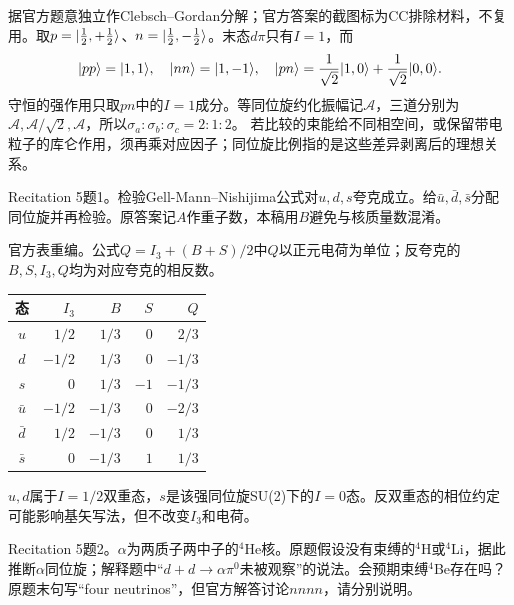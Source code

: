 \begin{solution}
据官方题意独立作Clebsch--Gordan分解；官方答案的截图标为CC排除材料，不复用。取$p=\lvert \frac12,+\frac12\rangle$、$n=\lvert \frac12,-\frac12\rangle$。末态$d\pi$只有$I=1$，而
\begin{equation}
 \lvert pp\rangle=\lvert 1,1\rangle,\quad \lvert nn\rangle=\lvert 1,-1\rangle,\quad
 \lvert pn\rangle=\frac1{\sqrt2}\lvert 1,0\rangle+\frac1{\sqrt2}\lvert 0,0\rangle.
\end{equation}
守恒的强作用只取$pn$中的$I=1$成分。等同位旋约化振幅记$\mathcal A$，三道分别为$\mathcal A,\mathcal A/\sqrt2,\mathcal A$，所以$\sigma_a:\sigma_b:\sigma_c=2:1:2$。
若比较的束能给不同相空间，或保留带电粒子的库仑作用，须再乘对应因子；同位旋比例指的是这些差异剥离后的理想关系。
\end{solution}
\begin{exercise}\label{ex:rec-5-1}
Recitation 5题1。检验Gell-Mann--Nishijima公式对$u,d,s$夸克成立。给$\bar u,\bar d,\bar s$分配同位旋并再检验。原答案记$A$作重子数，本稿用$B$避免与核质量数混淆。
\end{exercise}
\begin{solution}
官方表重编。公式$Q=I_3+(B+S)/2$中$Q$以正元电荷为单位；反夸克的$B,S,I_3,Q$均为对应夸克的相反数。
\begin{center}\begin{tabular}{c|rrrr}\toprule
态&$I_3$&$B$&$S$&$Q$\\\midrule
$u$&$1/2$&$1/3$&$0$&$2/3$\\
$d$&$-1/2$&$1/3$&$0$&$-1/3$\\
$s$&$0$&$1/3$&$-1$&$-1/3$\\
$\bar u$&$-1/2$&$-1/3$&$0$&$-2/3$\\
$\bar d$&$1/2$&$-1/3$&$0$&$1/3$\\
$\bar s$&$0$&$-1/3$&$1$&$1/3$\\\bottomrule
\end{tabular}\end{center}
$u,d$属于$I=1/2$双重态，$s$是该强同位旋SU(2)下的$I=0$态。反双重态的相位约定可能影响基矢写法，但不改变$I_3$和电荷。
\end{solution}
\begin{exercise}\label{ex:rec-5-2}
Recitation 5题2。$\alpha$为两质子两中子的$^4$He核。原题假设没有束缚的$^4$H或$^4$Li，据此推断$\alpha$同位旋；解释题中“$d+d\to\alpha\pi^0$未被观察”的说法。会预期束缚$^4$Be存在吗？原题末句写“four neutrinos”，但官方解答讨论$nnnn$，请分别说明。
\end{exercise}
